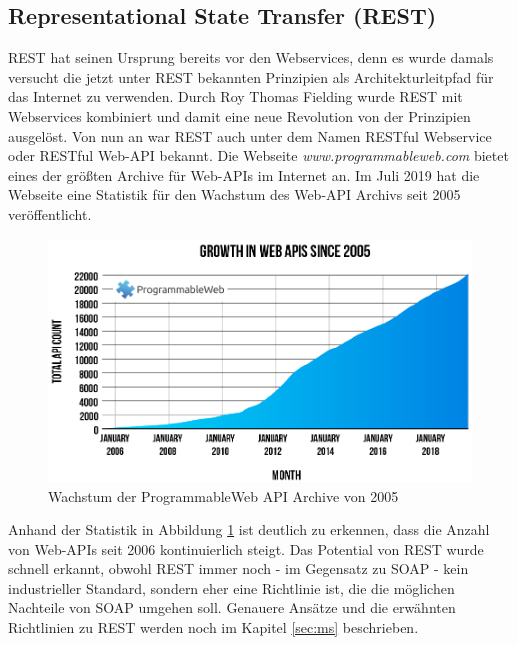 \subsection{Representational State Transfer (REST)}
\ac{REST} hat seinen Ursprung bereits vor den Webservices, denn es wurde damals versucht die jetzt unter \ac{REST} bekannten Prinzipien als Architekturleitpfad für das Internet zu verwenden. Durch Roy Thomas Fielding wurde \ac{REST} mit Webservices kombiniert und damit eine neue Revolution von der Prinzipien ausgelöst. Von nun an war \ac{REST} auch unter dem Namen RESTful Webservice oder RESTful Web-\ac{API} bekannt. Die Webseite \textit{www.programmableweb.com} bietet eines der größten Archive für Web-\acp{API} im Internet an. Im Juli 2019 hat die Webseite eine Statistik für den Wachstum des Web-\ac{API} Archivs seit 2005 veröffentlicht\autocite[][]{apiarchive}.

\begin{figure}[H]
\centering
\includegraphics[width=\pictureWidth cm]{Bilder/Statistik/ProgrammableWebApis.png}
\caption{Wachstum der ProgrammableWeb API Archive von 2005\label{fig:api_statistic}\protect\footnotemark}
\end{figure}

Anhand der Statistik in Abbildung \ref{fig:api_statistic} ist deutlich zu erkennen, dass die Anzahl von Web-\acp{API} seit 2006 kontinuierlich steigt. Das Potential von \ac{REST} wurde schnell erkannt, obwohl \ac{REST} immer noch - im Gegensatz zu SOAP - kein industrieller Standard, sondern eher eine Richtlinie ist, die die möglichen Nachteile von SOAP umgehen soll. Genauere Ansätze und die erwähnten Richtlinien zu \ac{REST} werden noch im Kapitel \ref{sec:ms} beschrieben.

